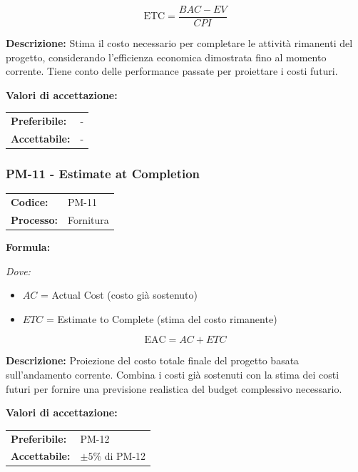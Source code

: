 \documentclass[a4paper,11pt,oneside]{scrartcl}
\begin{document}
\[
    \text{ETC} = \frac{BAC - EV}{CPI}
\]

\noindent\textbf{Descrizione:} Stima il costo necessario per completare le attività rimanenti del progetto, considerando l'efficienza economica dimostrata fino al momento corrente. Tiene conto delle performance passate per proiettare i costi futuri.

\vspace{0.2cm}
\noindent\textbf{Valori di accettazione:}
\vspace{0.1cm}

\noindent
\begin{tabular}{@{}ll@{}}
    \textbf{Preferibile:} & - \\
    \textbf{Accettabile:} & - \\
\end{tabular}

\subsubsection{PM-11 - Estimate at Completion}

\noindent
\begin{tabular}{@{}p{}p{}@{}}
    \textbf{Codice:}   & PM-11     \\
    \textbf{Processo:} & Fornitura \\
\end{tabular}

\vspace{0.3cm}
\noindent\textbf{Formula:}

\noindent\textit{Dove:}
\begin{itemize}[leftmargin=1.5cm, topsep=0pt, itemsep=0pt]
    \item $AC$ = Actual Cost (costo già sostenuto)
    \item $ETC$ = Estimate to Complete (stima del costo rimanente)
\end{itemize}

\[
    \text{EAC} = AC + ETC
\]

\noindent\textbf{Descrizione:} Proiezione del costo totale finale del progetto basata sull'andamento corrente. Combina i costi già sostenuti con la stima dei costi futuri per fornire una previsione realistica del budget complessivo necessario.

\vspace{0.2cm}
\noindent\textbf{Valori di accettazione:}
\vspace{0.1cm}

\noindent
\begin{tabular}{@{}ll@{}}
    \textbf{Preferibile:} & PM-12              \\
    \textbf{Accettabile:} & $\pm 5\%$ di PM-12 \\
\end{tabular}
\end{document}
